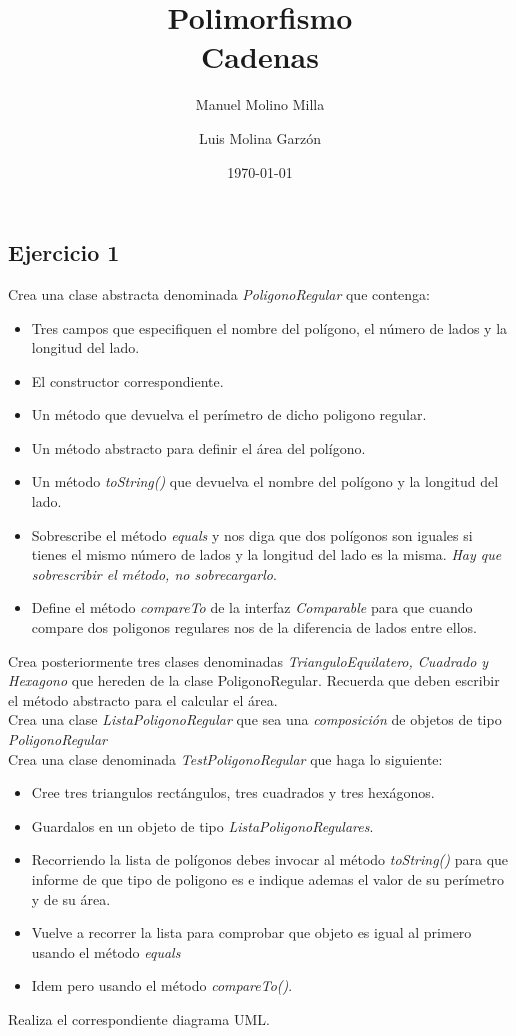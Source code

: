 \documentclass[4paper]{article}
\author{Manuel Molino Milla \and Luis Molina Garzón}
\title{\textbf{Polimorfismo}
\\Cadenas}
\date{\today}
\begin{document}
\maketitle

\subsection*{Ejercicio 1}
Crea una clase abstracta denominada \emph{PoligonoRegular} que contenga:
\begin{itemize}
\item Tres campos que especifiquen el nombre del polígono, el número de lados y la longitud del lado.
\item El constructor correspondiente.
\item Un método que devuelva el perímetro de dicho poligono regular.
\item Un método abstracto para definir el área del polígono.
\item Un método \emph{toString()} que devuelva el nombre del polígono y la longitud del lado.
\item Sobrescribe el método \emph{equals} y nos diga que dos polígonos son iguales si tienes el mismo número de lados y la longitud del lado es la misma. \emph{Hay que sobrescribir el método, no sobrecargarlo}.
\item Define el método \emph{compareTo} de la interfaz \emph{Comparable} para que cuando compare dos poligonos regulares nos de la diferencia de lados entre ellos.
\end{itemize}
Crea posteriormente tres clases denominadas \emph{TrianguloEquilatero, Cuadrado y Hexagono} que hereden de la clase PoligonoRegular. Recuerda que deben escribir el método abstracto para el calcular el área.\\
Crea una clase \emph{ListaPoligonoRegular} que sea una \emph{composición} de objetos de tipo \emph{PoligonoRegular}\\
Crea una clase denominada \emph{TestPoligonoRegular} que haga lo siguiente:
\begin{itemize}
\item Cree tres triangulos rectángulos, tres cuadrados y tres hexágonos. 
\item Guardalos en un objeto de tipo \emph{ListaPoligonoRegulares}.
\item Recorriendo la lista de polígonos debes invocar al método \emph{toString()} para que informe de que tipo de poligono es e indique ademas el valor de su perímetro y de su área.
\item Vuelve a recorrer la lista para comprobar que objeto es igual al primero  usando el método \emph{equals}
\item Idem pero usando el método \emph{compareTo()}.
\end{itemize}
Realiza el correspondiente diagrama UML.
\newpage
\end{document}
